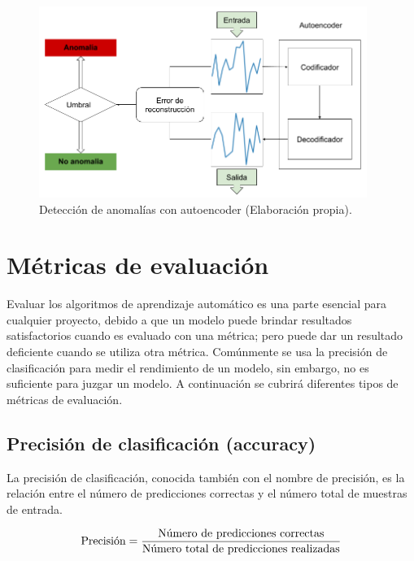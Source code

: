 \begin{figure}[h!]
  \begin{center}	\includegraphics[width=0.95\textwidth, frame]{imagenes/Cap4/autoencoder-anomaly}
  \caption{Detecci\'{o}n de anomal\'{i}as con autoencoder (Elaboraci\'{o}n propia).} 
  \label{fig:autoencoder-anomaly}
  \end{center}
\end{figure}


\section{M\'{e}tricas de evaluaci\'{o}n}

Evaluar los algoritmos de aprendizaje autom\'{a}tico es una parte esencial para cualquier proyecto, debido a que un modelo puede brindar resultados satisfactorios cuando es evaluado con una m\'{e}trica; pero puede dar un resultado deficiente cuando se utiliza otra m\'{e}trica. Com\'{u}nmente se usa la precisi\'{o}n de clasificaci\'{o}n para medir el rendimiento de un modelo, sin embargo, no es suficiente para juzgar un modelo. A continuaci\'{o}n se cubrir\'{a} diferentes tipos de m\'{e}tricas de evaluaci\'{o}n.

\subsection{Precisi\'{o}n de clasificaci\'{o}n (accuracy)}

La precisi\'{o}n de clasificaci\'{o}n, conocida tambi\'{e}n con el nombre de precisi\'{o}n, es la relaci\'{o}n entre el n\'{u}mero de predicciones correctas y el n\'{u}mero total de muestras de entrada.

\begin{equation}
\textup{Precisi\'{o}n} = \frac{\textup{N\'{u}mero de predicciones correctas}}{\textup{N\'{u}mero total de predicciones realizadas}}
\end{equation}

